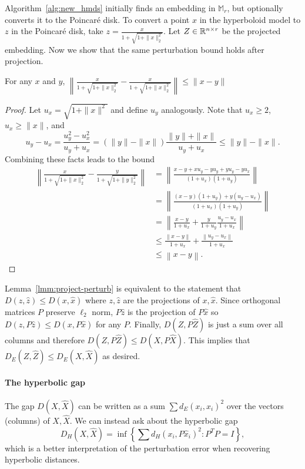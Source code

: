 Algorithm~\ref{alg:new_hmds} initially finds an embedding in $\mathbb{M}_r$, but optionally converts it to the Poincar{\'e} disk.
To convert a point $x$ in the hyperboloid model to $z$ in the Poincar{\'e} disk, take $z = \frac{x}{1 + \sqrt{1 + \|x\|_2^2}}$.
Let $Z \in \mathbb{R}^{n \times r}$ be the projected embedding.
Now we show that the same perturbation bound holds after projection.

\begin{lemma}
  \label{lmm:project-perturb}
  For any $x$ and $y$,
  $ \left\| \frac{x}{1 + \sqrt{1 + \|x\|_2^2}} - \frac{x}{1 + \sqrt{1 + \|x\|_2^2}} \right\| \le \| x-y \| $
\end{lemma}
\begin{proof}
  Let $u_x = \sqrt{1 + \|x\|^2}$ and define $u_y$ analogously.
  Note that $u_x \ge 2$, $u_x \ge \|x\|$, and
  \[
    u_y - u_x = \frac{u_y^2 - u_x^2}{u_y + u_x} = (\|y\|-\|x\|)\frac{\|y\|+\|x\|}{u_y + u_x} \le \|y\|-\|x\|.
  \]
  Combining these facts leads to the bound
  \begin{align*}
    \left\| \frac{x}{1 + \sqrt{1 + \|x\|_2^2}} - \frac{y}{1 + \sqrt{1 + \|y\|_2^2}} \right\| 
    &= \left\| \frac{x-y + x u_y - y u_y + y u_y - y u_x}{(1+u_x)(1+u_y)} \right\|
    \\&= \left\| \frac{(x-y)(1+u_y) + y(u_y - u_x)}{(1+u_x)(1+u_y)} \right\|
    \\&= \left\| \frac{x-y}{1+u_x} + \frac{y}{1+u_y}\frac{u_y-u_x}{1+u_x} \right\|
    \\&\le \frac{\left\| x-y \right\|}{1+u_x} + \frac{\left\| u_y-u_x \right\|}{1+u_x}
    \\&\le \left\| x-y \right\|.
  \end{align*}
\end{proof}

Lemma~\ref{lmm:project-perturb} is equivalent to the statement that $D(z, \hat z) \le D(x, \hat x)$ where $z, \hat z$ are the projections of $x, \hat x$.
Since orthogonal matrices $P$ preserve $\ell_2$ norm, $P\hat z$ is the projection of $P \hat x$ so $D(z, P \hat z) \le D(x, P \hat x)$ for any $P$.
Finally, $D(Z, P\hat Z)$ is just a sum over all columns and therefore $D(Z, P\hat Z) \le D(X, P\hat X)$.
This implies that $D_E(Z, \hat Z) \le D_E(X, \hat X)$ as desired.

\paragraph{The hyperbolic gap}
The gap $D(X,\hat X)$ can be written as a sum $\sum d_E(x_i, \hat{x}_i)^2$ over the vectors (columns) of $X,\hat X$.
We can instead ask about the hyperbolic gap
\[
  D_H(X, \hat X) = \inf \left\{ \sum d_H(x_i, P\hat{x}_i)^2 : P^T P = I \right\},
\]
which is a better interpretation of the perturbation error when recovering hyperbolic distances.

